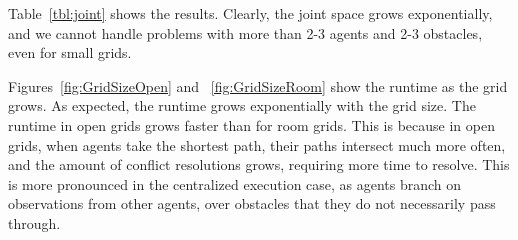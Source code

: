 \documentclass[letterpaper]{article} %
\begin{document}
Table~\ref{tbl:joint} shows the results. Clearly, the joint space grows exponentially, and we cannot handle problems with more than 2-3 agents and 2-3 obstacles, even for small grids.



Figures~\ref{fig:GridSizeOpen} and ~\ref{fig:GridSizeRoom} show the runtime as the grid grows. As expected, the runtime grows exponentially with the grid size. The runtime in open grids grows faster than for room grids. This is because in open grids, when agents take the shortest path, their paths intersect much more often, and the amount of conflict resolutions grows, requiring more time to resolve. This is more pronounced in the centralized execution case, as agents branch on observations from other agents, over obstacles that they do not necessarily pass through.
\end{document}
